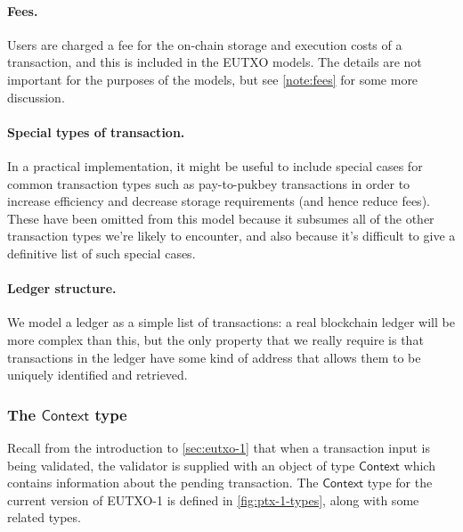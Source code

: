 \documentclass[a4paper]{article}
\newcounter{note}
\newcommand{\s}{\textsf}  %
\newcommand{\ctx}{\ensuremath{\s{Context}}}
\begin{document}
\paragraph{Fees.}  Users are charged a fee for the on-chain storage
and execution costs of a transaction, and this is included in the
EUTXO models.  The details are not important for the purposes of the
models, but see \cref{note:fees} for some more discussion.

\paragraph{Special types of transaction.} In a practical
implementation, it might be useful to include special cases for common
transaction types such as pay-to-pukbey transactions in order to
increase efficiency and decrease storage requirements (and hence
reduce fees).  These have been omitted from this model because it
subsumes all of the other transaction types we're likely to encounter,
and also because it's difficult to give a definitive list of such
special cases.

\paragraph{Ledger structure.} We model a ledger as a simple
list of transactions: a real blockchain ledger will be more complex
than this, but the only property that we really require is that
transactions in the ledger have some kind of address that allows them
to be uniquely identified and retrieved.

\subsubsection{The \ctx{} type}
\label{sec:context}
Recall from the introduction to \cref{sec:eutxo-1} that when a
transaction input is being validated, the validator is supplied
with an object of type \ctx{} which contains information about the
pending transaction.  The \ctx{} type for the current version of
EUTXO-1 is defined in \cref{fig:ptx-1-types}, along with some
related types.
\end{document}
